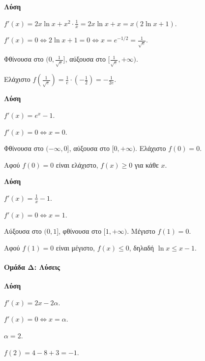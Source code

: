 \documentclass[11pt,a4paper,modern]{FFExercises}
\begin{document}
\askhsh %
\textbf{Λύση}
\begin{alist}
    \item $f'(x) = 2x \ln x + x^2 \cdot \frac{1}{x} = 2x \ln x + x = x(2\ln x + 1)$.
    \item $f'(x) = 0 \Leftrightarrow 2\ln x + 1 = 0 \Leftrightarrow x = e^{-1/2} = \frac{1}{\sqrt{e}}$.
    \item Φθίνουσα στο $(0, \frac{1}{\sqrt{e}}]$, αύξουσα στο $[\frac{1}{\sqrt{e}}, +\infty)$.
    \item Ελάχιστο $f\left(\frac{1}{\sqrt{e}}\right) = \frac{1}{e} \cdot \left(-\frac{1}{2}\right) = -\frac{1}{2e}$.
\end{alist}

\askhsh %
\textbf{Λύση}
\begin{alist}
    \item $f'(x) = e^x - 1$.
    \item $f'(x) = 0 \Leftrightarrow x = 0$.
    \item Φθίνουσα στο $(-\infty, 0]$, αύξουσα στο $[0, +\infty)$. Ελάχιστο $f(0) = 0$.
    \item Αφού $f(0) = 0$ είναι ελάχιστο, $f(x) \ge 0$ για κάθε $x$.
\end{alist}

\askhsh %
\textbf{Λύση}
\begin{alist}
    \item $f'(x) = \frac{1}{x} - 1$.
    \item $f'(x) = 0 \Leftrightarrow x = 1$.
    \item Αύξουσα στο $(0, 1]$, φθίνουσα στο $[1, +\infty)$. Μέγιστο $f(1) = 0$.
    \item Αφού $f(1) = 0$ είναι μέγιστο, $f(x) \le 0$, δηλαδή $\ln x \le x - 1$.
\end{alist}

\paragraph{Ομάδα Δ: Λύσεις}

\askhsh %
\textbf{Λύση}
\begin{alist}
    \item $f'(x) = 2x - 2\alpha$.
    \item $f'(x) = 0 \Leftrightarrow x = \alpha$.
    \item $\alpha = 2$.
    \item $f(2) = 4 - 8 + 3 = -1$.
\end{alist}
\end{document}
